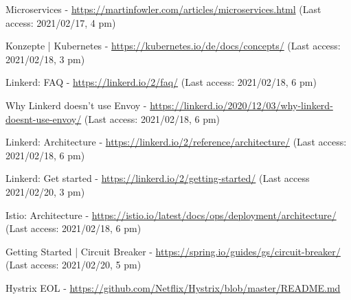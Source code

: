 \begin{thebibliography}{00}
 Microservices - \url{https://martinfowler.com/articles/microservices.html} (Last access: 2021/02/17, 4 pm)

 Konzepte | Kubernetes - \url{https://kubernetes.io/de/docs/concepts/} (Last access: 2021/02/18, 3 pm)

 Linkerd: FAQ - \url{https://linkerd.io/2/faq/} (Last access: 2021/02/18, 6 pm)

 Why Linkerd doesn't use Envoy - \url{https://linkerd.io/2020/12/03/why-linkerd-doesnt-use-envoy/} (Last access: 2021/02/18, 6 pm)

 Linkerd: Architecture - \url{https://linkerd.io/2/reference/architecture/} (Last access: 2021/02/18, 6 pm)

 Linkerd: Get started - \url{https://linkerd.io/2/getting-started/} (Last access 2021/02/20, 3 pm)

 Istio: Architecture - \url{https://istio.io/latest/docs/ops/deployment/architecture/} (Last access: 2021/02/18, 6 pm)

 Getting Started | Circuit Breaker - \url{https://spring.io/guides/gs/circuit-breaker/} (Last access: 2021/02/20, 5 pm)

 Hystrix EOL - \url{https://github.com/Netflix/Hystrix/blob/master/README.md}
\end{thebibliography}